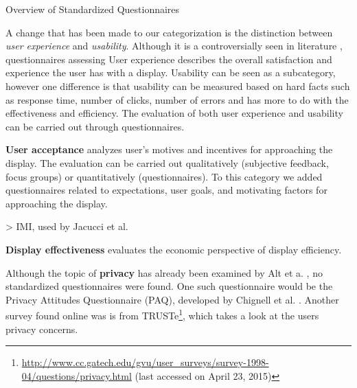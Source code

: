 		\begin{table}[p]
			\small
			\center
			\begin{adjustwidth}{-1.5cm}{}
			    
			    \caption[Standardized Questionnaires]{Overview of Standardized Questionnaires}
			\label{table:standardized-questionnaires}
			            \end{adjustwidth}

		\end{table}


	

\clearpage

	A change that has been made to our categorization is the distinction between \textit{user experience} and \textit{usability}. Although it is a controversially seen in literature \cite{bevan2009difference}, questionnaires assessing 
	User experience describes the overall satisfaction and experience the user has with a display. Usability can be seen as a subcategory, however one difference is that usability can be measured based on hard facts such as response time, number of clicks, number of errors and has more to do with the effectiveness and efficiency. The evaluation of both user experience and usability can be carried out through questionnaires. %

	\textbf{User acceptance} analyzes user's motives and incentives for approaching the display. The evaluation can be carried out qualitatively (subjective feedback, focus groups) or quantitatively (questionnaires). To this category we added questionnaires related to expectations, user goals, and motivating factors for approaching the display. 

		> IMI, used by Jacucci et al. \cite{jacucci2010worldsofinformation}


			\textbf{Display effectiveness} evaluates the economic perspective of display efficiency. 

	Although the topic of \textbf{privacy} has already been examined by Alt et a. \cite{alt2011digifieds}, no standardized questionnaires were found. One such questionnaire would be the Privacy Attitudes Questionnaire (PAQ), developed by Chignell et al. \cite{chignell2003privacy}. Another survey found online was is from TRUSTe\footnote{\url{http://www.cc.gatech.edu/gvu/user_surveys/survey-1998-04/questions/privacy.html} (last accessed on April 23, 2015)}, which takes a look at the users privacy concerns.

